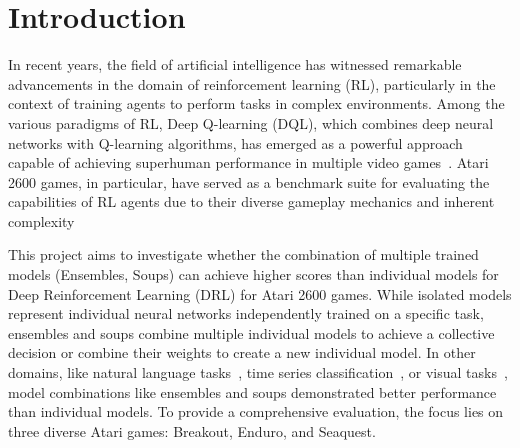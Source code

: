 


\chapter{Introduction}

In recent years, the field of artificial intelligence has witnessed remarkable advancements in the domain of reinforcement learning (RL), particularly in the context of training agents to perform tasks in complex environments. Among the various paradigms of RL, Deep Q-learning  (DQL), which combines deep neural networks with Q-learning algorithms, has emerged as a powerful approach capable of achieving superhuman performance in multiple video games~\parencite{mnih_human-level_2015,arulkumaran_deep_2017,shao_survey_2019}. Atari 2600 games, in particular, have served as a benchmark suite for evaluating the capabilities of RL agents due to their diverse gameplay mechanics and inherent complexity~\parencite{mnih_playing_2013,mnih_human-level_2015,van_hasselt_deep_2015}

This project aims to investigate whether the combination of multiple trained models (Ensembles, Soups) can achieve higher scores than individual models for Deep Reinforcement Learning (DRL) for Atari 2600 games. While isolated models represent individual neural networks independently trained on a specific task, ensembles and soups combine multiple individual models to achieve a collective decision or combine their weights to create a new individual model. In other domains, like natural language tasks~\parencite{wortsman_model_2022,kanakaraj_performance_2015}, time series classification~\parencite{ismail_fawaz_deep_2019}, or visual tasks~\parencite{wen_ensemble_2017,goyal_deep_2018,maron_model_2022,dansereau_model_2023}, model combinations like ensembles and soups demonstrated better performance than individual models. To provide a comprehensive evaluation, the focus lies on three diverse Atari games: Breakout, Enduro, and Seaquest.

